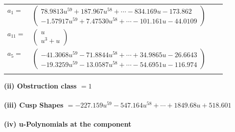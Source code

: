 \documentclass[1p]{elsarticle_modified}
\theoremstyle{definition}
\begin{document}
\begin{tabular}{m{7pt} m{180pt} m{7pt} m{180pt} }
\flushright $a_{1}=$&$\begin{pmatrix}78.9813 u^{59}+187.967 u^{58}+\cdots-834.169 u-173.862\\-1.57917 u^{59}+7.47530 u^{58}+\cdots-101.161 u-44.0109\end{pmatrix}$ \\
\flushright $a_{11}=$&$\begin{pmatrix}u\\u^3+u\end{pmatrix}$ \\
\flushright $a_{5}=$&$\begin{pmatrix}-41.3068 u^{59}-71.8844 u^{58}+\cdots+34.9865 u-26.6643\\-19.3259 u^{59}-13.0587 u^{58}+\cdots-54.6951 u-116.974\end{pmatrix}$\\&\end{tabular}
\flushleft \textbf{(ii) Obstruction class $= 1$}\\~\\
\flushleft \textbf{(iii) Cusp Shapes $= -227.159 u^{59}-547.164 u^{58}+\cdots+1849.68 u+518.601$}\\~\\
\newpage\renewcommand{\arraystretch}{1}
\flushleft \textbf{(iv) u-Polynomials at the component}\newline \\
\end{document}
